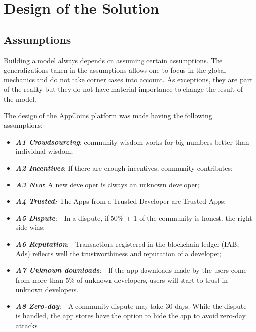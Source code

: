\section{Design of the Solution}

\label{sec:design}

\subsection{Assumptions }


Building a model always depends on assuming certain assumptions. The generalizations taken in the assumptions allows one to focus in the global mechanics and do not take corner cases into account. As exceptions, they are part of the reality but they do not have material importance to change the result of the model.

The design of the AppCoins platform was made having the following assumptions:

\begin{itemize}
\item {\bf\em A1 Crowdsourcing}: community wisdom works for big numbers better than individual wisdom\cite{Surowiecki:2005:WC:1095645};
\item {\bf\em A2 Incentives}: If there are enough incentives, community contributes;
\item {\bf\em A3 New}: A new developer is always an unknown developer;
\item {\bf\em A4 Trusted:} The Apps from a Trusted Developer are Trusted Apps;
\item {\bf\em A5 Dispute}: - In a dispute, if 50\% + 1 of the community is honest, the right side wins;
\item {\bf\em A6 Reputation}: - Transactions registered in the blockchain ledger (IAB, Ads) reflects well the trustworthiness and reputation of a developer;
\item {\bf\em A7 Unknown downloads}: - If the app downloads made by the users come from more than 5\% of unknown developers, users will start to trust in unknown developers. %
\item {\bf\em A8 Zero-day}: - A community dispute may take 30 days. While the dispute is handled, the app stores have the option to hide the app to avoid zero-day attacks.
\end{itemize}



